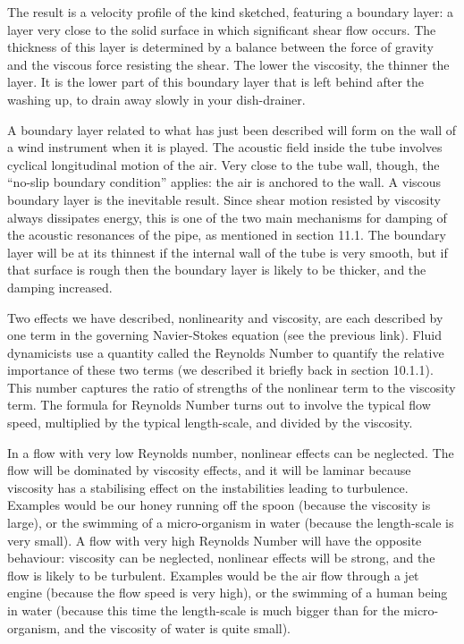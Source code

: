   The result is a velocity profile of the kind sketched, featuring a boundary 
  layer: a layer very close to the solid surface in which significant shear 
  flow occurs. The thickness of this layer is determined by a balance between 
  the force of gravity and the viscous force resisting the shear. The lower the 
  viscosity, the thinner the layer. It is the lower part of this boundary layer 
  that is left behind after the washing up, to drain away slowly in your 
  dish-drainer. 

  A boundary layer related to what has just been described will form on the 
  wall of a wind instrument when it is played. The acoustic field inside the 
  tube involves cyclical longitudinal motion of the air. Very close to the tube 
  wall, though, the “no-slip boundary condition” applies: the air is anchored 
  to the wall. A viscous boundary layer is the inevitable result. Since shear 
  motion resisted by viscosity always dissipates energy, this is one of the two 
  main mechanisms for damping of the acoustic resonances of the pipe, as 
  mentioned in section 11.1. The boundary layer will be at its thinnest if the 
  internal wall of the tube is very smooth, but if that surface is rough then 
  the boundary layer is likely to be thicker, and the damping increased. 


  Two effects we have described, nonlinearity and viscosity, are each described 
  by one term in the governing Navier-Stokes equation (see the previous link). 
  Fluid dynamicists use a quantity called the Reynolds Number to quantify the 
  relative importance of these two terms (we described it briefly back in 
  section 10.1.1). This number captures the ratio of strengths of the nonlinear 
  term to the viscosity term. The formula for Reynolds Number turns out to 
  involve the typical flow speed, multiplied by the typical length-scale, and 
  divided by the viscosity. 

  In a flow with very low Reynolds number, nonlinear effects can be neglected. 
  The flow will be dominated by viscosity effects, and it will be laminar 
  because viscosity has a stabilising effect on the instabilities leading to 
  turbulence. Examples would be our honey running off the spoon (because the 
  viscosity is large), or the swimming of a micro-organism in water (because 
  the length-scale is very small). A flow with very high Reynolds Number will 
  have the opposite behaviour: viscosity can be neglected, nonlinear effects 
  will be strong, and the flow is likely to be turbulent. Examples would be the 
  air flow through a jet engine (because the flow speed is very high), or the 
  swimming of a human being in water (because this time the length-scale is 
  much bigger than for the micro-organism, and the viscosity of water is quite 
  small). 

